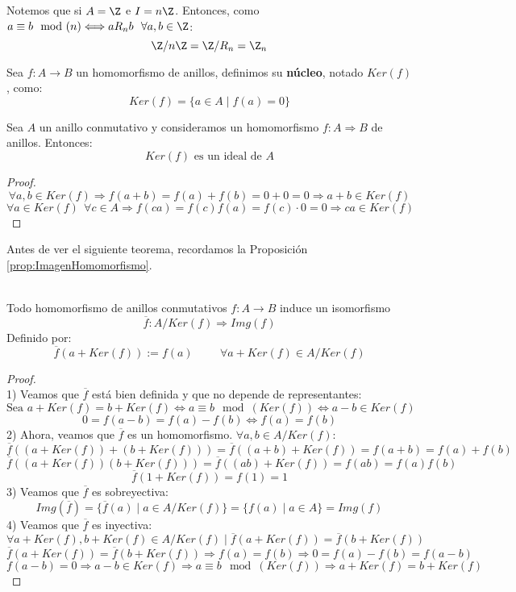 \noindent
Notemos que si $A=\Z$ e $I=n\Z$. \newline Entonces, como $a\equiv b\mod(n)\Longleftrightarrow aR_nb~~\forall a,b \in \Z$:
$$\Z/n\Z = \Z/R_n = \Z_n$$

\begin{definicion}
    Sea $f:A\rightarrow B$ un homomorfismo de anillos, definimos su \textbf{núcleo}, notado $Ker(f)$, como:
    $$Ker(f) = \{a \in A \mid f(a) = 0\}$$
\end{definicion}

\begin{prop}
    Sea $A$ un anillo conmutativo y consideramos un homomorfismo $f:A\Longrightarrow B$ de anillos. Entonces:
    $$Ker(f) \mbox{ es un ideal de } A$$
\begin{proof}
    $$\forall a,b \in Ker(f) \Longrightarrow f(a+b) = f(a)+f(b) = 0+0 = 0 \Longrightarrow a+b \in Ker(f)$$
    $$\forall a \in Ker(f)~~\forall c\in A \Longrightarrow f(ca) = f(c)f(a) = f(c)\cdot 0 = 0 \Longrightarrow ca \in Ker(f)$$
\end{proof}
\end{prop}



Antes de ver el siguiente teorema, recordamos la Proposición \ref{prop:ImagenHomomorfismo}.

\begin{teo}
    \ \\
    Todo homomorfismo de anillos conmutativos $f:A\rightarrow B$ induce un isomorfismo
    $$\overline{f}:A/Ker(f)\Longrightarrow Img(f)$$
    Definido por:
    $$\overline{f}(a+Ker(f)) := f(a)\hspace{1cm}\forall a+Ker(f) \in A/Ker(f)$$
\begin{proof}
    \ \\
    1) Veamos que $\overline{f}$ está bien definida y que no depende de representantes:
    $$\mbox{Sea } a+Ker(f) = b+Ker(f) \Longleftrightarrow a\equiv b\mod(Ker(f)) \Longleftrightarrow a-b \in Ker(f)$$
    $$0 = f(a-b) = f(a)-f(b) \Longleftrightarrow f(a) = f(b)$$
    2) Ahora, veamos que $\overline{f}$ es un homomorfismo. $\forall a,b \in A/Ker(f)$:
    $$\overline{f}((a+Ker(f))+(b+Ker(f))) = \overline{f}((a+b)+Ker(f)) = f(a+b) = f(a)+f(b)$$
    $$\overline{f}((a+Ker(f))(b+Ker(f))) = \overline{f}((ab)+Ker(f)) = f(ab) = f(a)f(b)$$
    $$\overline{f}(1+Ker(f)) = f(1) = 1$$
    3) Veamos que $\overline{f}$ es sobreyectiva:
    $$Img(\overline{f}) = \{\overline{f}(a) \mid a \in A/Ker(f)\} = \{f(a) \mid a \in A\} = Img(f)$$
    4) Veamos que $\overline{f}$ es inyectiva:
    $$\forall a+Ker(f),b+Ker(f) \in A/Ker(f) \mid \overline{f}(a+Ker(f)) = \overline{f}(b+Ker(f))$$
    $$\overline{f}(a+Ker(f)) = \overline{f}(b+Ker(f)) \Longrightarrow f(a)=f(b) \Longrightarrow 0=f(a)-f(b) = f(a-b)$$
    $$f(a-b)=0 \Longrightarrow a-b \in Ker(f) \Longrightarrow a\equiv b\mod(Ker(f)) \Longrightarrow a+Ker(f)=b+Ker(f)$$
\end{proof}
\end{teo}


